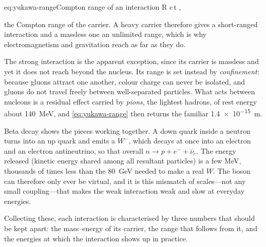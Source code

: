     \begin{keyeq}{eq:yukawa-range}{Compton range of an interaction}
        R \simeq c\,\Delta t \simeq {},
    \end{keyeq}

    the Compton range of the carrier. A heavy carrier therefore gives a short-ranged interaction and a massless one an unlimited range, which is why electromagnetism and gravitation reach as far as they do.

    The strong interaction is the apparent exception, since its carrier is massless and yet it does not reach beyond the nucleus. Its range is set instead by \emph{confinement}: because gluons attract one another, colour charge can never be isolated, and gluons do not travel freely between well-separated particles. What acts between nucleons is a residual effect carried by \emph{pions}, the lightest hadrons, of rest energy about \qty{140}{\mega\electronvolt}, and \cref{eq:yukawa-range} then returns the familiar \qty{1.4e-15}{\metre}.

    Beta decay shows the pieces working together. A down quark inside a neutron turns into an up quark and emits a $W^{-}$, which decays at once into an electron and an electron antineutrino, so that overall $n\to p+e^{-}+\bar{\nu}_{e}$. The energy released (kinetic energy shared among all resultant particles) is a few MeV, thousands of times less than the \qty{80}{\giga\electronvolt} needed to make a real $W$. The boson can therefore only ever be virtual, and it is this mismatch of scales---not any small coupling---that makes the weak interaction weak and slow at everyday energies.

    Collecting these, each interaction is characterised by three numbers that should be kept apart: the mass--energy of its carrier, the range that follows from it, and the energies at which the interaction shows up in practice.

